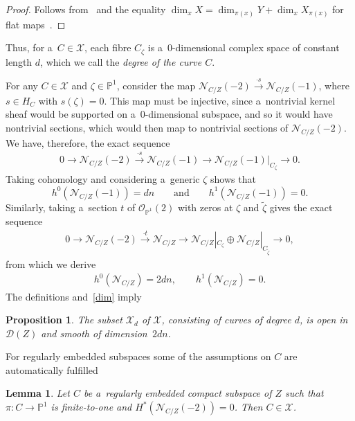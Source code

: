 \documentclass[pdftex]{sigma}
\numberwithin{equation}{section}
\newtheorem{Lemma}[Theorem]{Lemma}
\newtheorem{Proposition}[Theorem]{Proposition}
{\theoremstyle{definition}
\newtheorem{Definition}[Theorem]{Definition}
\newtheorem{Remark}[Theorem]{Remark}
}
\begin{document}
\begin{proof}
Follows from~\cite[Corollary 18.17]{Eis1} and the equality $\dim_xX=\dim_{\pi(x)}Y+\dim_{x} X_{\pi(x)}$ for f\/lat
maps~\cite[Proposition II.2.11]{GR}.
\end{proof}

Thus, for a~$C\in {\mathcal{X}}$, each f\/ibre $C_\zeta$ is a~$0$-dimensional complex space of constant length $d$, which
we call the {\em degree of the curve $C$}.

For any $C\in {\mathcal{X}}$ and $\zeta\in {\mathbb{P}}^1$, consider the map ${\mathcal{N}}_{C/Z}(-2)\stackrel{\cdot
s}{\longrightarrow} {\mathcal{N}}_{C/Z}(-1)$, where $s\in H_C$ with $s(\zeta)=0$.
This map must be injective, since a~nontrivial kernel sheaf would be supported on a~$0$-dimensional subspace, and so it
would have nontrivial sections, which would then map to nontrivial sections of ${\mathcal{N}}_{C/Z}(-2)$.
We have, therefore, the exact sequence
\begin{gather}
0\to {\mathcal{N}}_{C/Z}(-2)\stackrel{\cdot s}{\longrightarrow} {\mathcal{N}}_{C/Z}(-1)\longrightarrow
{\mathcal{N}}_{C/Z}(-1)|_{C_\zeta}\to 0.
\label{seq}
\end{gather}
Taking cohomology and considering a~generic $\zeta$ shows that
\[
h^0( {\mathcal{N}}_{C/Z}(-1))=dn \qquad \text{and}\qquad h^1(
{\mathcal{N}}_{C/Z}(-1))=0.
\]
Similarly, taking a~section $t$ of ${\mathcal{O}}_{{\mathbb{P}}^1}(2)$ with zeros at $\zeta$ and $\tilde\zeta$ gives the
exact sequence
\begin{gather}
0\to {\mathcal{N}}_{C/Z}(-2)\stackrel{\cdot t}{\longrightarrow} {\mathcal{N}}_{C/Z}\longrightarrow
{\mathcal{N}}_{C/Z}|_{C_\zeta}\oplus {\mathcal{N}}_{C/Z}|_{C_{\tilde\zeta}}\to 0,
\label{seqq}
\end{gather}
from which we derive
\begin{gather}
h^0( {\mathcal{N}}_{C/Z})=2dn,
\qquad
h^1( {\mathcal{N}}_{C/Z})=0.
\label{dim}
\end{gather}
The def\/initions and~\eqref{dim} imply
\begin{Proposition}
The subset ${\mathcal{X}}_d$ of ${\mathcal{X}}$, consisting of curves of degree $d$, is open in ${\mathcal{D}}(Z)$ and
smooth of dimension~$2dn$.
\end{Proposition}

For regularly embedded subspaces some of the assumptions on $C$ are automatically fulf\/illed

\begin{Lemma}\label{ooo}
Let $C$ be a~regularly embedded compact subspace of $Z$ such that $\pi:C\to {\mathbb{P}}^1$ is finite-to-one and
$H^\ast({\mathcal{N}}_{C/Z}(-2))=0$.
Then $C\in {\mathcal{X}}$.
\end{Lemma}
\end{document}
